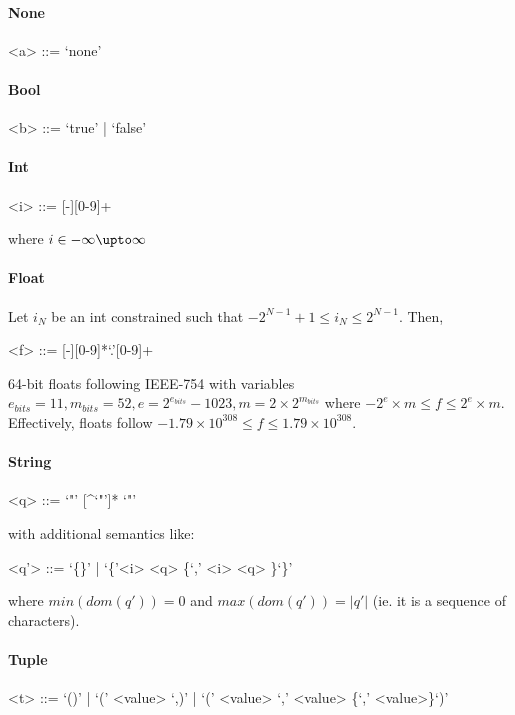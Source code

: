 \paragraph{None}
\begin{grammar}
<a> ::= `none'
\end{grammar}
\paragraph{Bool}
\begin{grammar}
<b> ::= `true' | `false'
\end{grammar}
\paragraph{Int}
\begin{grammar}
<i> ::= [-][0-9]+
\end{grammar}
where $i \in -\infty \upto \infty$
\paragraph{Float}
Let $i_N$ be an int constrained such that $-2^{N-1}+1 \leq i_N \leq 2^{N-1}$. Then,
\begin{grammar}
<f> ::= [-][0-9]*`.'[0-9]+
\end{grammar}
64-bit floats following IEEE-754 %
with variables $e_{bits} = 11, m_{bits} = 52, e = 2^{e_{bits}}-1023, m = 2 \times 2^{m_{bits}}$
where $-2^e\times m \leq f \leq 2^e\times m$. Effectively, floats follow $ -1.79\times 10^{308} \leq f \leq 1.79\times 10^{308}$.
\paragraph{String}
\begin{grammar}
<q> ::= `"' [\^{}`"']* `"'
\end{grammar}
with additional semantics like:
\begin{grammar}
<q'> ::= `\{\}' | `\{'<i> \lit{$\mapsto$} <q> \{`,' <i> \lit{$\mapsto$} <q> \}`\}'
\end{grammar}
where $min(dom(q')) = 0$ and $max(dom(q')) = |q'|$ (ie. it is a sequence of characters).
\paragraph{Tuple}
\begin{grammar}
<t> ::= `()' | `(' <value> `,)' | `(' <value> `,' <value> \{`,' <value>\}`)'
\end{grammar}
